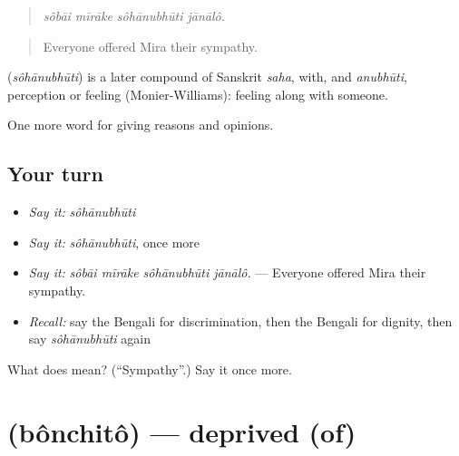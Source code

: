 \begin{quote}
   
\end{quote}

\begin{quote}
\emph{sôbāi mīrāke sôhānubhūti jānālô.}
\end{quote}

\begin{quote}
Everyone offered Mira their sympathy.
\end{quote}

\begin{cousinweb}
\textbf{} (\emph{sôhānubhūti}) is a later compound of Sanskrit \emph{saha}, with, and \emph{anubhūti}, perception or feeling (Monier-Williams): feeling along with someone.
\end{cousinweb}

\begin{grammarlens}[title={What you've built}]
One more word for giving reasons and opinions.
\end{grammarlens}

\subsection*{Your turn}
\begin{itemize}
\raggedright
  \item \emph{Say it:} \emph{sôhānubhūti}
  \item \emph{Say it:} \emph{sôhānubhūti}, once more
  \item \emph{Say it:} \emph{sôbāi mīrāke sôhānubhūti jānālô.} — Everyone offered Mira their sympathy.
  \item \emph{Recall:} say the Bengali for discrimination, then the Bengali for dignity, then say \emph{sôhānubhūti} again
\end{itemize}

\begin{tcolorbox}[breakable,colback=teal!4,colframe=teal!35!black,title={Before you move on}]
What does  mean? (\textquotedblleft{}Sympathy\textquotedblright{}.) Say it once more.
\end{tcolorbox}
\section[\texorpdfstring{\bn{বঞ্চিত} (bônchitô)}{বঞ্চিত (bônchitô)}]{ (bônchitô) — deprived (of)}

\label{lesson:BN-C352-bonchito}



